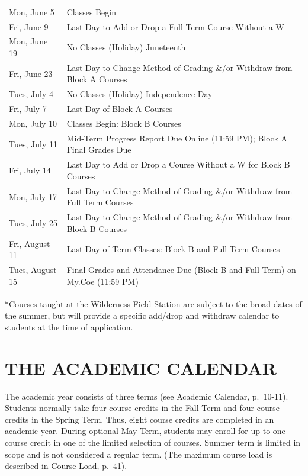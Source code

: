 \documentclass[
  letterpaper,
]{scrbook}
\renewcommand\toprule[2]\relax
\renewcommand\bottomrule[2]\relax
\begin{document}
\begin{longtable}[]{@{}
  >{\raggedright\arraybackslash}p{}
  >{\raggedleft\arraybackslash}p{}@{}}
\toprule\noalign{}
\endhead
\bottomrule\noalign{}
\endlastfoot
Mon, June 5 & Classes Begin \\
Fri, June 9 & Last Day to Add or Drop a Full-Term Course Without a W \\
Mon, June 19 & No Classes (Holiday) Juneteenth \\
Fri, June 23 & Last Day to Change Method of Grading \&/or Withdraw from
Block A Courses \\
Tues, July 4 & No Classes (Holiday) Independence Day \\
Fri, July 7 & Last Day of Block A Courses \\
Mon, July 10 & Classes Begin: Block B Courses \\
Tues, July 11 & Mid-Term Progress Report Due Online (11:59 PM); Block A
Final Grades Due \\
Fri, July 14 & Last Day to Add or Drop a Course Without a W for Block B
Courses \\
Mon, July 17 & Last Day to Change Method of Grading \&/or Withdraw from
Full Term Courses \\
Tues, July 25 & Last Day to Change Method of Grading \&/or Withdraw from
Block B Courses \\
Fri, August 11 & Last Day of Term Classes: Block B and Full-Term
Courses \\
Tues, August 15 & Final Grades and Attendance Due (Block B and
Full-Term) on My.Coe (11:59 PM) \\
\end{longtable}

*Courses taught at the Wilderness Field Station are subject to the broad
dates of the summer, but will provide a specific add/drop and withdraw
calendar to students at the time of application.

\chapter{THE ACADEMIC CALENDAR}\label{the-academic-calendar}

The academic year consists of three terms (see Academic Calendar,
p.~10-11). Students normally take four course credits in the Fall Term
and four course credits in the Spring Term. Thus, eight course credits
are completed in an academic year. During optional May Term, students
may enroll for up to one course credit in one of the limited selection
of courses. Summer term is limited in scope and is not considered a
regular term. (The maximum course load is described in Course Load,
p.~41).
\end{document}
